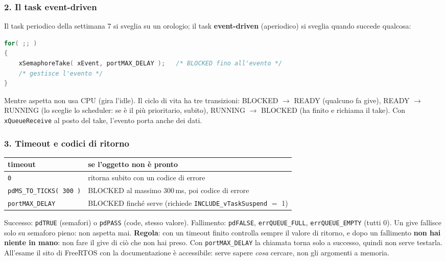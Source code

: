 \subsubsection*{2. Il task event-driven}
Il task periodico della settimana 7 si sveglia su un orologio; il task \textbf{event-driven} (aperiodico) si sveglia quando succede qualcosa:
\begin{lstlisting}[language=C, showstringspaces=false, basicstyle=\ttfamily\footnotesize]
for( ;; )
{
    xSemaphoreTake( xEvent, portMAX_DELAY );   /* BLOCKED fino all'evento */
    /* gestisce l'evento */
}
\end{lstlisting}
Mentre aspetta non usa CPU (gira l'idle). Il ciclo di vita ha tre transizioni: BLOCKED $\rightarrow$ READY (qualcuno fa give), READY $\rightarrow$ RUNNING (lo sceglie lo scheduler: se è il più prioritario, subito), RUNNING $\rightarrow$ BLOCKED (ha finito e richiama il take). Con \texttt{xQueueReceive} al posto del take, l'evento porta anche dei dati.

\subsubsection*{3. Timeout e codici di ritorno}
\begin{center}
\small
\begin{tabular}{P{0.3} P{0.6}}
    \hline
    \textbf{timeout} & \textbf{se l'oggetto non è pronto} \\
    \hline
    \texttt{0} & ritorna subito con un codice di errore \\
    \texttt{pdMS\_TO\_TICKS( 300 )} & BLOCKED al massimo 300\,ms, poi codice di errore \\
    \texttt{portMAX\_DELAY} & BLOCKED finché serve (richiede \texttt{INCLUDE\_vTaskSuspend} $=$ 1) \\
    \hline
\end{tabular}
\end{center}
Successo: \texttt{pdTRUE} (semafori) o \texttt{pdPASS} (code, stesso valore). Fallimento: \texttt{pdFALSE}, \texttt{errQUEUE\_FULL}, \texttt{errQUEUE\_EMPTY} (tutti 0). Un give fallisce solo su semaforo pieno: non aspetta mai. \textbf{Regola}: con un timeout finito controlla sempre il valore di ritorno, e dopo un fallimento \textbf{non hai niente in mano}: non fare il give di ciò che non hai preso. Con \texttt{portMAX\_DELAY} la chiamata torna solo a successo, quindi non serve testarla. All'esame il sito di FreeRTOS con la documentazione è accessibile: serve sapere \emph{cosa} cercare, non gli argomenti a memoria.

